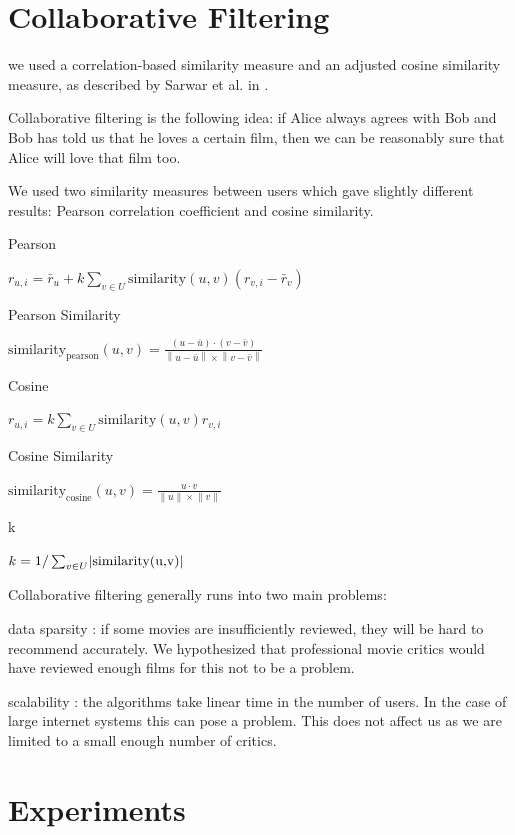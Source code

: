 \documentclass[12pt]{article}
\newcommand{\norm}[1]{\left\lVert#1\right\rVert}
\DeclarePairedDelimiter\abs{\lvert}{\rvert}%
\begin{document}
\section{Collaborative Filtering}


we used a correlation-based similarity measure and an adjusted cosine similarity measure, as described by Sarwar et al. in \cite{Sarwar01}.

Collaborative filtering is the following idea: if Alice always agrees with Bob and Bob has told us that he loves a certain film, then we can be reasonably sure that Alice will love that film too.

We used two similarity measures between users which gave slightly different results: Pearson correlation coefficient and cosine similarity.



Pearson

\( r_{u,i} = \bar{r}_u + k \sum_{v \in U} \text{similarity}(u,v) (r_{v,i}-\bar{r}_v) \)

Pearson Similarity

\( \text{similarity}_{\text{pearson}}(u,v) = \frac{ (u - \bar{u}) \cdot (v - \bar{v})}{\norm{u - \bar{u}} \times \norm{v-\bar{v}}} \)

Cosine

\( r_{u,i} = k \sum_{v \in U} \text{similarity}(u,v) r_{v,i}  \)

Cosine Similarity

\( \text{similarity}_{\text{cosine}}(u,v) = \frac{u \cdot v}{\norm{u} \times \norm{v}} \)

k

\( k = 1 / \sum_{v \in U} \abs{\text{similarity(u,v)}} \)




Collaborative filtering generally runs into two main problems:

data sparsity : if some movies are insufficiently reviewed, they will be hard to recommend accurately. 
We hypothesized that professional movie critics would have reviewed enough films for this not to be a problem.

scalability : the algorithms take linear time in the number of users. In the case of large internet systems this can pose a problem.
This does not affect us as we are limited to a small enough number of critics.



\section{Experiments}
\end{document}
